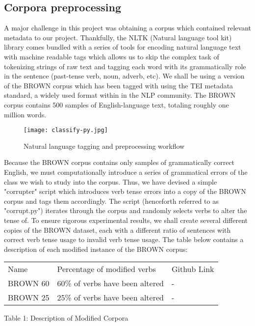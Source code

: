 \documentclass{article}
\begin{document}
\subsection{Corpora preprocessing}
A major challenge in this project was obtaining a corpus which contained relevant metadata to our project. Thankfully, the NLTK (Natural language tool kit) library comes bundled with a series of tools for encoding natural language text with machine readable tags which allows us to skip the complex task of tokenizing strings of raw text and tagging each word with its grammatically role in the sentence (past-tense verb, noun, adverb, etc). We shall be using a version of the BROWN corpus which has been tagged with using the TEI metadata standard, a widely used format within in the NLP community. The BROWN corpus contains 500 samples of English-language text, totaling roughly one million words. \citep{Brown}
\begin{center}
\begin{figure}[h!]
\centering
\texttt{[image: classify-py.jpg]}
\caption{Natural language tagging and preprocessing workflow}
\label{fig:univerise}
\end{figure}
\end{center}


Because the BROWN corpus contains only samples of grammatically correct English, we must computationally introduce a series of grammatical errors of the class we wish to study into the corpus. Thus, we have devised a simple "corrupter" script which introduces verb tense errors into a copy of the BROWN corpus and tags them accordingly. The script (henceforth referred to as "corrupt.py")
iterates through the corpus and randomly selects verbs to alter the tense of. To ensure rigorous experimental results, we shall create several different copies of the BROWN dataset, each with a different ratio of sentences with correct verb tense usage to invalid verb tense usage. The table below contains a description of each modified instance of the BROWN corpus:
\begin{center}

\begin{tabular}{ l l l }

    \hline			


  Name & Percentage of modified verbs  & Github
  Link \\
  BROWN 60 & 60\% of verbs have been altered & - \\
   BROWN 25 & 25\% of verbs have been altered & - \\
    \hline  
\end{tabular}
\newline
Table 1: Description of Modified Corpora 

\end{center}
    
\end{document}
